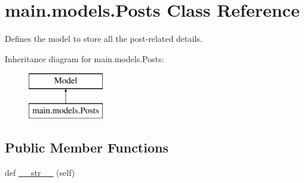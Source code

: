 \hypertarget{classmain_1_1models_1_1Posts}{}\section{main.\+models.\+Posts Class Reference}
\label{classmain_1_1models_1_1Posts}


Defines the model to store all the post-\/related details.  


Inheritance diagram for main.\+models.\+Posts\+:\begin{figure}[H]
\begin{center}
\leavevmode
\includegraphics[height=2.000000cm]{classmain_1_1models_1_1Posts}
\end{center}
\end{figure}
\subsection*{Public Member Functions}
\begin{DoxyCompactItemize}
\item 
def \hyperlink{classmain_1_1models_1_1Posts_a1beebe8f01eb6f1cf42f33a877c1b73a}{\+\_\+\+\_\+str\+\_\+\+\_\+} (self)
\end{DoxyCompactItemize}
